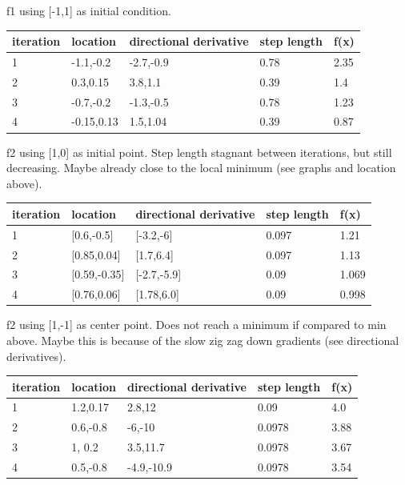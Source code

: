 \documentclass[7pt]{article}
\begin{document}
			
			f1 using [-1,1] as initial condition. 
				\begin{center}
					\begin{tabular}{ | l | l | l | l | l |}
						\hline
						iteration & location & directional derivative & step length & f(x) \\ \hline
						1& -1.1,-0.2 & -2.7,-0.9 & 0.78 & 2.35\\ \hline
						2& 0.3,0.15 & 3.8,1.1  & 0.39 & 1.4\\ \hline
						3& -0.7,-0.2 & -1.3,-0.5  & 0.78 & 1.23\\ \hline
						4& -0.15,0.13 & 1.5,1.04  & 0.39 & 0.87\\
						\hline
					\end{tabular}
				\end{center}
			
			f2 using [1,0] as initial point. Step length stagnant between iterations, but still decreasing. Maybe already close to the local minimum (see graphs and location above). 
			\begin{center}
				\begin{tabular}{ | l | l | l | l | l |}
					\hline
					iteration & location & directional derivative & step length & f(x) \\ \hline
					1& [0.6,-0.5]  &[-3.2,-6]  & 0.097 & 1.21\\ \hline
					2& [0.85,0.04]& [1.7,6.4] & 0.097 & 1.13\\ \hline
					3& [0.59,-0.35] & [-2.7,-5.9] & 0.09 & 1.069\\ \hline
					4& [0.76,0.06] &[1.78,6.0]  & 0.09 & 0.998\\
					\hline
				\end{tabular}
				
			\end{center}
			
			f2 using [1,-1] as center point. Does not reach a minimum if compared to min above. Maybe this is because of the slow zig zag down gradients (see directional derivatives). 
				\begin{center}
					\begin{tabular}{ | l | l | l | l | l |}
						\hline
						iteration & location & directional derivative & step length & f(x) \\ \hline
						1& 1.2,0.17  & 2.8,12  & 0.09 & 4.0\\ \hline
						2& 0.6,-0.8 & -6,-10  & 0.0978 & 3.88\\ \hline
						3& 1, 0.2 & 3.5,11.7 & 0.0978 & 3.67\\ \hline
						4& 0.5,-0.8 & -4.9,-10.9  & 0.0978 & 3.54\\
						\hline
					\end{tabular}
				\end{center}
				
\end{document}
